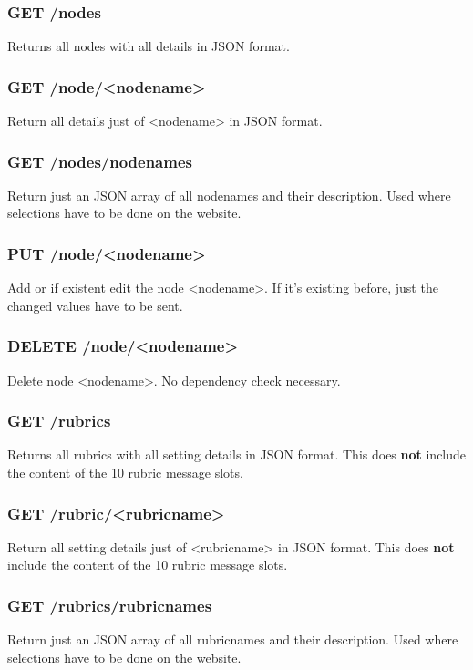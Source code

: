 \subsubsection{GET /nodes}
Returns all nodes with all details in JSON format.

\subsubsection{GET /node/<nodename>}
Return all details just of <nodename> in JSON format.

\subsubsection{GET /nodes/nodenames}
Return just an JSON array of all nodenames and their description. Used where selections have to be done on the website.

\subsubsection{PUT /node/<nodename>}
Add or if existent edit the node <nodename>. If it's existing before, just the changed values have to be sent.

\subsubsection{DELETE /node/<nodename>}
Delete node <nodename>. No dependency check necessary.

\subsubsection{GET /rubrics}
Returns all rubrics with all setting details in JSON format. This does \textbf{not} include the content of the 10 rubric message slots.

\subsubsection{GET /rubric/<rubricname>}
Return all setting details just of <rubricname> in JSON format. This does \textbf{not} include the content of the 10 rubric message slots.

\subsubsection{GET /rubrics/rubricnames}
Return just an JSON array of all rubricnames and their description. Used where selections have to be done on the website.

